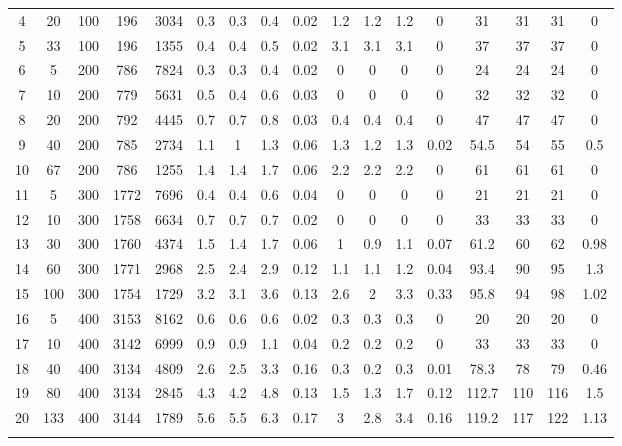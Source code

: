 \documentclass[11pt]{article}
\newcommand{\np}{\newpage}
\begin{document}
\begin{appendices}
\begin{landscape}
\begin{longtable}[c]{ccccc|cccc|cccc|cccc}
				4 & 20 & 100 & 196 & 3034 & 0.3 & 0.3 & 0.4 & 0.02 & 1.2 & 1.2 & 1.2 & 0 & 31 & 31 & 31 & 0 \\
				\rowcolor[HTML]{EFEFEF} 
				5 & 33 & 100 & 196 & 1355 & 0.4 & 0.4 & 0.5 & 0.02 & 3.1 & 3.1 & 3.1 & 0 & 37 & 37 & 37 & 0 \\
				6 & 5 & 200 & 786 & 7824 & 0.3 & 0.3 & 0.4 & 0.02 & 0 & 0 & 0 & 0 & 24 & 24 & 24 & 0 \\
				7 & 10 & 200 & 779 & 5631 & 0.5 & 0.4 & 0.6 & 0.03 & 0 & 0 & 0 & 0 & 32 & 32 & 32 & 0 \\
				8 & 20 & 200 & 792 & 4445 & 0.7 & 0.7 & 0.8 & 0.03 & 0.4 & 0.4 & 0.4 & 0 & 47 & 47 & 47 & 0 \\
				9 & 40 & 200 & 785 & 2734 & 1.1 & 1 & 1.3 & 0.06 & 1.3 & 1.2 & 1.3 & 0.02 & 54.5 & 54 & 55 & 0.5 \\
				10 & 67 & 200 & 786 & 1255 & 1.4 & 1.4 & 1.7 & 0.06 & 2.2 & 2.2 & 2.2 & 0 & 61 & 61 & 61 & 0 \\
				\rowcolor[HTML]{EFEFEF} 
				11 & 5 & 300 & 1772 & 7696 & 0.4 & 0.4 & 0.6 & 0.04 & 0 & 0 & 0 & 0 & 21 & 21 & 21 & 0 \\
				\rowcolor[HTML]{EFEFEF} 
				12 & 10 & 300 & 1758 & 6634 & 0.7 & 0.7 & 0.7 & 0.02 & 0 & 0 & 0 & 0 & 33 & 33 & 33 & 0 \\
				\rowcolor[HTML]{EFEFEF} 
				13 & 30 & 300 & 1760 & 4374 & 1.5 & 1.4 & 1.7 & 0.06 & 1 & 0.9 & 1.1 & 0.07 & 61.2 & 60 & 62 & 0.98 \\
				\rowcolor[HTML]{EFEFEF} 
				14 & 60 & 300 & 1771 & 2968 & 2.5 & 2.4 & 2.9 & 0.12 & 1.1 & 1.1 & 1.2 & 0.04 & 93.4 & 90 & 95 & 1.3 \\
				\rowcolor[HTML]{EFEFEF} 
				15 & 100 & 300 & 1754 & 1729 & 3.2 & 3.1 & 3.6 & 0.13 & 2.6 & 2 & 3.3 & 0.33 & 95.8 & 94 & 98 & 1.02 \\
				16 & 5 & 400 & 3153 & 8162 & 0.6 & 0.6 & 0.6 & 0.02 & 0.3 & 0.3 & 0.3 & 0 & 20 & 20 & 20 & 0 \\
				17 & 10 & 400 & 3142 & 6999 & 0.9 & 0.9 & 1.1 & 0.04 & 0.2 & 0.2 & 0.2 & 0 & 33 & 33 & 33 & 0 \\
				18 & 40 & 400 & 3134 & 4809 & 2.6 & 2.5 & 3.3 & 0.16 & 0.3 & 0.2 & 0.3 & 0.01 & 78.3 & 78 & 79 & 0.46 \\
				19 & 80 & 400 & 3134 & 2845 & 4.3 & 4.2 & 4.8 & 0.13 & 1.5 & 1.3 & 1.7 & 0.12 & 112.7 & 110 & 116 & 1.5 \\
				20 & 133 & 400 & 3144 & 1789 & 5.6 & 5.5 & 6.3 & 0.17 & 3 & 2.8 & 3.4 & 0.16 & 119.2 & 117 & 122 & 1.13 \\ \np
				\rowcolor[HTML]{EFEFEF} 

\end{longtable}
\end{landscape}
\end{appendices}
\end{document}

